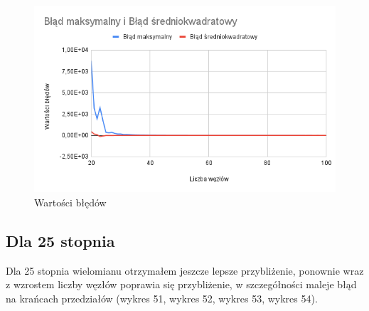 \documentclass{article}
\begin{document}
\begin{figure}[H]
  \centering
  \begin{minipage}[b]{0.4\textwidth}
    \includegraphics[width=\textwidth]{img50.png}
    \caption{Wartości błędów}
  \end{minipage}
\end{figure}

\newpage

\subsection{Dla 25 stopnia}

Dla 25 stopnia wielomianu otrzymałem jeszcze lepsze przybliżenie, ponownie wraz z wzrostem liczby węzłów poprawia się przybliżenie, w szczegółności maleje błąd na krańcach przedziałów (wykres 51, wykres 52, wykres 53, wykres 54).
\end{document}
